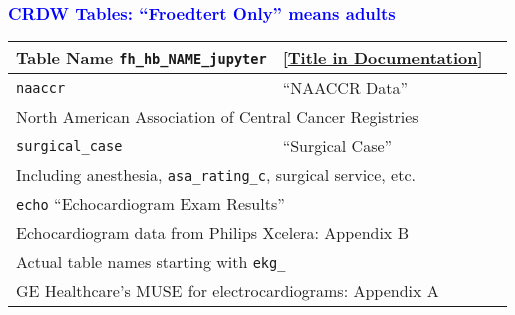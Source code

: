 \documentclass[11pt,pdftex,dvipsnames,usenames]{beamer}
\begin{document}
\begin{frame}[fragile]\frametitle{\bf\textcolor{blue}{CRDW Tables: ``Froedtert Only'' means adults}}
\begin{tabular}{lll}
Table Name  \texttt{fh\_hb\_NAME\_jupyter} & 
\textcolor{PineGreen}{[\href{https://share.ctsi.mcw.edu/s/8gj39XFxP9oeGGY}{Title in Documentation}]} \\ \hline
\texttt{naaccr}       & ``NAACCR Data'' \\ 
\multicolumn{3}{l}{North American Association of Central Cancer Registries} \\ \hline 
\texttt{surgical\_case}       & ``Surgical Case'' \\ 
\multicolumn{3}{l}{Including anesthesia, \texttt{asa\_rating\_c}, surgical service, etc.} \\ \hline
\multicolumn{2}{l}{\texttt{echo} \qquad \qquad \qquad \qquad \quad ``Echocardiogram Exam Results''} \\ 
\multicolumn{3}{l}{Echocardiogram data from Philips Xcelera: Appendix B} \\ \hline
\multicolumn{2}{l}{Actual table names starting with \texttt{ekg\_}} \\
\multicolumn{3}{l}{GE Healthcare's MUSE for electrocardiograms: Appendix A} \\ \hline
\end{tabular}

\end{frame}
\end{document}
